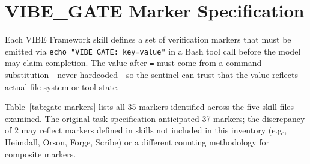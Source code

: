 \section{VIBE\_GATE Marker Specification}
\label{app:vibegatemarkers}

Each VIBE Framework skill defines a set of verification markers that must be
emitted via \texttt{echo "VIBE\_GATE: key=value"} in a Bash tool call before
the model may claim completion. The value after \texttt{=} must come from a
command substitution---never hardcoded---so the sentinel can trust that the
value reflects actual file-system or tool state.

Table~\ref{tab:gate-markers} lists all 35 markers identified across the five
skill files examined. The original task specification anticipated 37 markers;
the discrepancy of 2 may reflect markers defined in skills not included in this
inventory (e.g., Heimdall, Orson, Forge, Scribe) or a different counting
methodology for composite markers.

